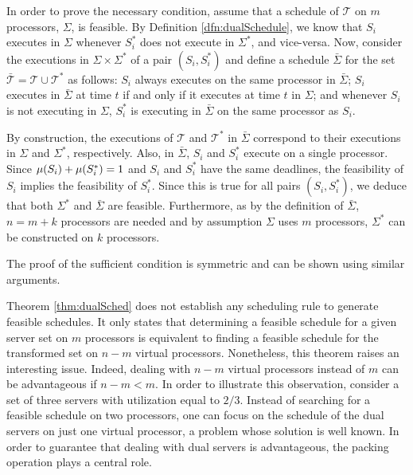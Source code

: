 \documentclass[twocolumn, compsocconf]{IEEEtran}
\newcommand{\sched}{\ensuremath{\Sigma}\xspace}
\newcommand{\servSet}{\ensuremath{\mathcal{T}}}
\newcounter{proc}
\begin{document}
\begin{IEEEproof}
  In order to prove the necessary condition, assume that a schedule of
  $\servSet$ on $m$ processors, $\sched$, is feasible.  By Definition
  \ref{dfn:dualSchedule}, we know that $S_i$ executes in $\sched$ whenever
  $S_i^*$ does not execute in $\sched^*$, and vice-versa. Now, consider the
  executions in $\sched \times \sched^*$ of a pair $(S_i,S_i^*)$ and define a
  schedule $\bar{\sched}$ for the set $\bar{\servSet} = \servSet \cup
  \servSet^*$ as follows: $S_i$ always executes on the same processor in
  $\bar{\sched}$; $S_i$ executes in $\bar{\sched}$ at time $t$ if and only if it
  executes at time $t$ in $\sched$; and whenever $S_i$ is not executing in
  $\sched$, $S_i^*$ is executing in $\bar{\sched}$ on the same processor as
  $S_i$.
  
  By construction, the executions of $\servSet$ and $\servSet^*$ in
  $\bar{\sched}$ correspond to their executions in $\sched$ and $\sched^*$,
  respectively. Also, in $\bar{\sched}$, $S_i$ and $S_i^*$ execute on a single
  processor. Since $\mu(S_i) + \mu(S_i^*) = 1$ and $S_i$ and $S_i^*$ have
  the same deadlines, the feasibility of $S_i$ implies the feasibility of
  $S_i^*$. Since this is true for all pairs $(S_i, S_i^*)$, we deduce that both
  $\sched^*$ and $\bar{\sched}$ are feasible. Furthermore, as by the definition
  of $\bar{\sched}$, $n=m+k$ processors are needed and by assumption $\sched$
  uses $m$ processors, $\sched^*$ can be constructed on $k$ processors.

  The proof of the sufficient condition is symmetric and can be shown using
  similar arguments.
\end{IEEEproof}

Theorem \ref{thm:dualSched} does not establish any scheduling rule to generate
feasible schedules. It only states that determining a feasible schedule for a
given server set on $m$ processors is equivalent to finding a feasible schedule
for the transformed set on $n-m$ virtual processors.  Nonetheless, this theorem
raises an interesting issue. Indeed, dealing with $n-m$ virtual processors
instead of $m$ can be advantageous if $n-m < m$. In order to illustrate this
observation, consider a set of three servers with utilization equal to
$2/3$. Instead of searching for a feasible schedule on two processors, one can
focus on the schedule of the dual servers on just one virtual processor, a
problem whose solution is well known. In order to guarantee that dealing with
dual servers is advantageous, the packing operation plays a central role.
\end{document}
